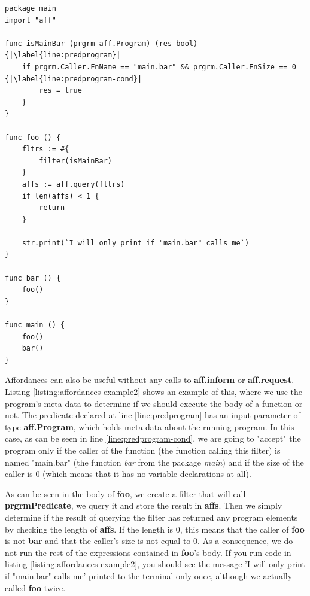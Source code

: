 \documentclass[11pt,fleqn,openany]{book} %
\begin{document}


\begin{lstlisting}[caption={Using affordances on an expression},captionpos=b,label={listing:affordances-example2}]
package main
import "aff"

func isMainBar (prgrm aff.Program) (res bool) {|\label{line:predprogram}|
  	if prgrm.Caller.FnName == "main.bar" && prgrm.Caller.FnSize == 0 {|\label{line:predprogram-cond}|
		res = true
	}
}

func foo () {
  	fltrs := #{
		filter(isMainBar)
  	}
  	affs := aff.query(fltrs)
  	if len(affs) < 1 {
  		return
  	}
	
  	str.print(`I will only print if "main.bar" calls me`)
}

func bar () {
 	foo()
}

func main () {
  	foo()
  	bar()
}
\end{lstlisting}

Affordances can also be useful without any calls to \textbf{aff.inform} or \textbf{aff.request}. Listing \ref{listing:affordances-example2} shows an example of this, where we use the program's meta-data to determine if we should execute the body of a function or not. The predicate declared at line \ref{line:predprogram} has an input parameter of type \textbf{aff.Program}, which holds meta-data about the running program. In this case, as can be seen in line \ref{line:predprogram-cond}, we are going to "accept" the program only if the caller of the function (the function calling this filter) is named "main.bar" (the function \textit{bar} from the package \textit{main}) and if the size of the caller is 0 (which means that it has no variable declarations at all).

As can be seen in the body of \textbf{foo}, we create a filter that will call \textbf{prgrmPredicate}, we query it and store the result in \textbf{affs}. Then we simply determine if the result of querying the filter has returned any program elements by checking the length of \textbf{affs}. If the length is 0, this means that the caller of \textbf{foo} is not \textbf{bar} and that the caller's size is not equal to 0. As a consequence, we do not run the rest of the expressions contained in \textbf{foo}'s body. If you run code in listing \ref{listing:affordances-example2}, you should see the message 'I will only print if "main.bar" calls me' printed to the terminal only once, although we actually called \textbf{foo} twice.
\end{document}
